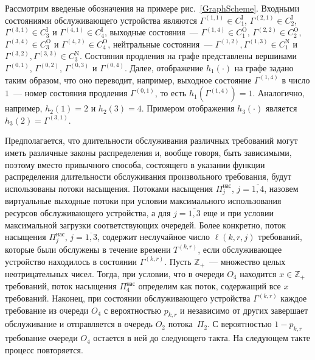 Рассмотрим введеные обозначения на примере рис.~\ref{GraphScheme}. Входными состояниями обслуживающего устройства являются $\Gamma^{(1, 1)} \in C_1^{\mathrm{I}}$,  $\Gamma^{(2, 1)} \in C_2^{\mathrm{I}}$,  $\Gamma^{(3, 1)} \in C_3^{\mathrm{I}}$ и $\Gamma^{(4, 1)} \in C_4^{\mathrm{I}}$,  выходные состояния~--- $\Gamma^{(1, 4)} \in C_1^{\mathrm{O}}$,  $\Gamma^{(2, 2)} \in C_2^{\mathrm{O}}$,  $\Gamma^{(3, 4)} \in C_3^{\mathrm{O}}$ и $\Gamma^{(4, 2)} \in C_4^{\mathrm{O}}$,  нейтральные состояния~--- $\Gamma^{(1, 2)},  \Gamma^{(1, 3)} \in C_1^{\mathrm{N}}$ и $\Gamma^{(3, 2)},  \Gamma^{(3, 3)} \in C_3^{\mathrm{N}}$. Состояния продления на графе представлены вершинами $\Gamma^{(0, 1)}$,  $\Gamma^{(0, 2)}$,  $\Gamma^{(0, 3)}$ и $\Gamma^{(0, 4)}$. Далее,  отображение $h_1(\cdot)$ на графе задано таким образом,  что оно переводит,  например,  выходное состояние $\Gamma^{(1, 4)}$ в число $1$~--- номер состояния продления $\Gamma^{(0, 1)}$,  то есть $h_1(\Gamma^{(1, 4)})=1$. Аналогично,  например,  $h_2(1)=2$ и $h_2(3)=4$. Примером отображения $h_3(\cdot)$ является $h_3(2)=\Gamma^{(3, 1)}$.


Предполагается,  что длительности обслуживания различных требований могут  иметь различные законы распределения и,  вообще говоря,  быть зависимыми,  поэтому вместо привычного способа,  состоящего в указании функции распределения длительности обслуживания произвольного требования,  будут использованы потоки насыщения. Потоками насыщения $\Pi^{\mathrm{\text{нас}}}_j$,  $j=\overline{1, 4}$,  назовем виртуальные выходные потоки при условии максимального использования ресурсов обслуживающего устройства,  а для $j=\overline{1, 3}$ еще и при условии максимальной загрузки соответствующих очередей.
Более конкретно,  поток насыщения $\Pi^{\mathrm{\text{нас}}}_j$,  $j=\overline{1, 3}$,  содержит неслучайное число $\ell(k, r, j)$ требований,  которые были обслужены в течение времени $T^{(k, r)}$,  если обслуживающее устройство находилось в состоянии $\Gamma^{(k, r)}$. Пусть $\mathbb{Z}_+$~--- множество целых неотрицательных чисел. Тогда,  при условии,  что в очереди $O_4$ находится $x \in \mathbb{Z}_+$ требований,  поток насыщения $\Pi^{\mathrm{\text{нас}}}_4$ определим как поток,  содержащий все $x$ требований.
Наконец,  при состоянии обслуживающего устройства $\Gamma^{(k, r)}$ каждое требование из очереди $O_4$ с вероятностью $p_{k, r}$ и независимо от других завершает обслуживание и отправляется в очередь $O_2$ потока~$\Pi_2$. С вероятностью $1-p_{k, r}$ требование очереди $O_4$ остается в ней до следующего такта. На следующем такте процесс повторяется.


